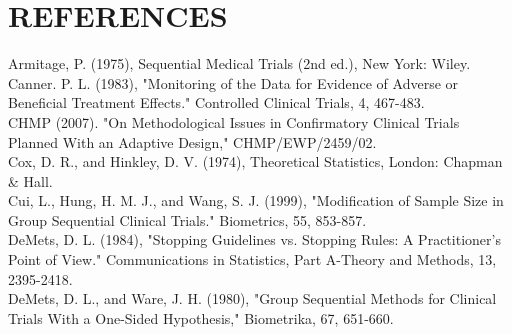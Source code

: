 \documentclass[10pt]{article}
\begin{document}
\section*{REFERENCES}
Armitage, P. (1975), Sequential Medical Trials (2nd ed.), New York: Wiley.\\
Canner. P. L. (1983), "Monitoring of the Data for Evidence of Adverse or Beneficial Treatment Effects." Controlled Clinical Trials, 4, 467-483.\\
CHMP (2007). "On Methodological Issues in Confirmatory Clinical Trials Planned With an Adaptive Design," CHMP/EWP/2459/02.\\
Cox, D. R., and Hinkley, D. V. (1974), Theoretical Statistics, London: Chapman \& Hall.\\
Cui, L., Hung, H. M. J., and Wang, S. J. (1999), "Modification of Sample Size in Group Sequential Clinical Trials." Biometrics, 55, 853-857.\\
DeMets, D. L. (1984), "Stopping Guidelines vs. Stopping Rules: A Practitioner's Point of View." Communications in Statistics, Part A-Theory and Methods, 13, 2395-2418.\\
DeMets, D. L., and Ware, J. H. (1980), "Group Sequential Methods for Clinical Trials With a One-Sided Hypothesis," Biometrika, 67, 651-660.
\end{document}
